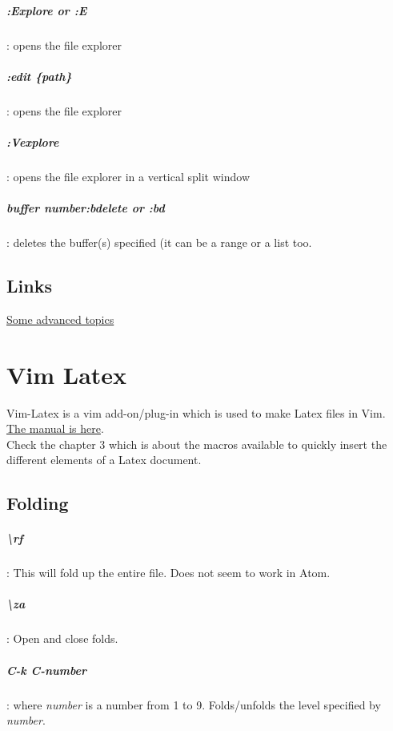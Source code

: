 \documentclass[10pt,letterpaper]{book}
\begin{document}
\paragraph{:Explore or :E}: opens the file explorer
\paragraph{:edit \{path\}}: opens the file explorer
\paragraph{:Vexplore}: opens the file explorer in a vertical split window
\paragraph{\textit{buffer number}:bdelete or :bd}: deletes the buffer(s) specified (it can be a range or a list too.
\section{Links}
\href{https://github.com/t9md/atom-vim-mode-plus/wiki/AdvancedTopicTutorial#0-text-to-use-in-this-tour}{Some advanced topics}\\

\chapter{Vim Latex}
Vim-Latex is a vim add-on/plug-in which is used to make Latex files in Vim.\\
\href{http://vim-latex.sourceforge.net/documentation/latex-suite/}{The manual is here}.\\
Check the chapter 3 which is about the macros available to quickly insert the different elements of a Latex document.
\section{Folding}
\paragraph{\textbackslash rf}: This will fold up the entire file. Does not seem to work in Atom.
\paragraph{\textbackslash za}: Open and close folds.
\paragraph{C-k C-number}: where \textit{number} is a number from 1 to 9. Folds/unfolds the level specified by \textit{number}.
\end{document}
